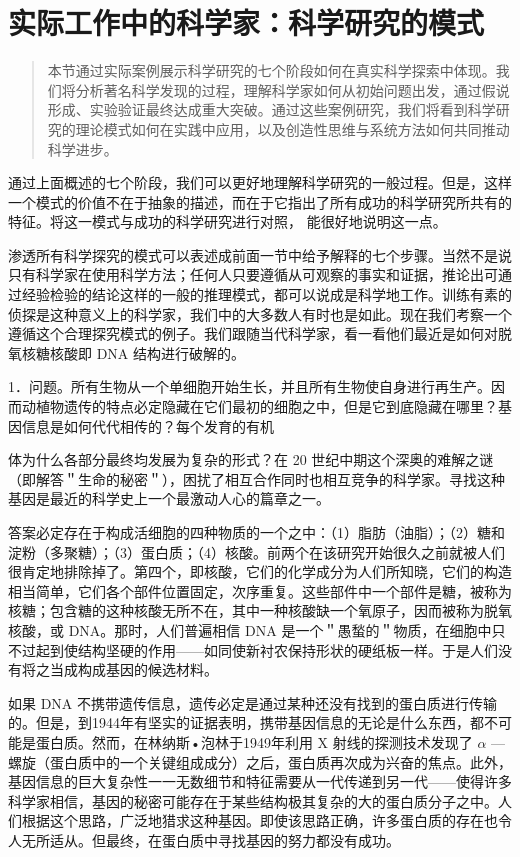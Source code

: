 \section{实际工作中的科学家：科学研究的模式}

\begin{quotation}
本节通过实际案例展示科学研究的七个阶段如何在真实科学探索中体现。我们将分析著名科学发现的过程，理解科学家如何从初始问题出发，通过假说形成、实验验证最终达成重大突破。通过这些案例研究，我们将看到科学研究的理论模式如何在实践中应用，以及创造性思维与系统方法如何共同推动科学进步。
\end{quotation}

通过上面概述的七个阶段，我们可以更好地理解科学研究的一般过程。但是，这样一个模式的价值不在于抽象的描述，而在于它指出了所有成功的科学研究所共有的特征。将这一模式与成功的科学研究进行对照， 能很好地说明这一点。

渗透所有科学探究的模式可以表述成前面一节中给予解释的七个步骤。当然不是说只有科学家在使用科学方法；任何人只要遵循从可观察的事实和证据，推论出可通过经验检验的结论这样的一般的推理模式，都可以说成是科学地工作。训练有素的侦探是这种意义上的科学家，我们中的大多数人有时也是如此。现在我们考察一个遵循这个合理探究模式的例子。我们跟随当代科学家，看一看他们最近是如何对脱氧核糖核酸即 DNA 结构进行破解的。\cite{watson1968}

1．问题。所有生物从一个单细胞开始生长，并且所有生物使自身进行再生产。因而动植物遗传的特点必定隐藏在它们最初的细胞之中，但是它到底隐藏在哪里？基因信息是如何代代相传的？每个发育的有机

体为什么各部分最终均发展为复杂的形式？在 20 世纪中期这个深奥的难解之谜（即解答＂生命的秘密＂），困扰了相互合作同时也相互竞争的科学家。寻找这种基因是最近的科学史上一个最激动人心的篇章之一。

答案必定存在于构成活细胞的四种物质的一个之中：（1）脂肪（油脂）；（2）糖和淀粉（多聚糖）；（3）蛋白质；（4）核酸。前两个在该研究开始很久之前就被人们很肯定地排除掉了。第四个，即核酸，它们的化学成分为人们所知晓，它们的构造相当简单，它们各个部件位置固定，次序重复。这些部件中一个部件是糖，被称为核糖；包含糖的这种核酸无所不在，其中一种核酸缺一个氧原子，因而被称为脱氧核酸，或 DNA。那时，人们普遍相信 DNA 是一个＂愚蝵的＂物质，在细胞中只不过起到使结构坚硬的作用——如同使新衬农保持形状的硬纸板一样。于是人们没有将之当成构成基因的候选材料。

如果 DNA 不携带遗传信息，遗传必定是通过某种还没有找到的蛋白质进行传输的。但是，到1944年有坚实的证据表明，携带基因信息的无论是什么东西，都不可能是蛋白质。然而，在林纳斯•泡林于1949年利用 X 射线的探测技术发现了 $\alpha$ —螺旋（蛋白质中的一个关键组成成分）之后，蛋白质再次成为兴奋的焦点。此外，基因信息的巨大复杂性一一无数细节和特征需要从一代传递到另一代——使得许多科学家相信，基因的秘密可能存在于某些结构极其复杂的大的蛋白质分子之中。人们根据这个思路，广泛地猎求这种基因。即使该思路正确，许多蛋白质的存在也令人无所适从。但最终，在蛋白质中寻找基因的努力都没有成功。

